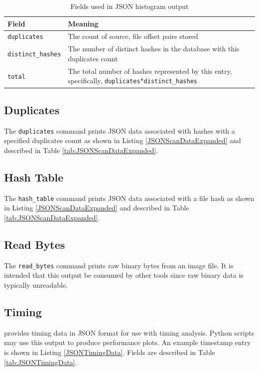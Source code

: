 \documentclass[11pt,fleqn]{article} %
\begin{document}
\begin{table}[!ht]

\centering
\caption{Fields used in JSON histogram output}
\label{tab:JSONHistogram}
\begin{tabular}{|p{5 cm}|p{8.8 cm}|}
\hline \hline
\textbf{Field} & \textbf{Meaning} \\
\hline
\verb+duplicates+ & The count of source, file offset pairs stored\\
\hline
\verb+distinct_hashes+ & The number of distinct hashes in the database with this duplicates count\\
\hline
\verb+total+ & The total number of hashes represented by this entry, specifically, \verb+duplicates+$*$\verb+distinct_hashes+\\
\hline
\end{tabular}
\end{table}

\subsection{Duplicates}
The \verb+duplicates+ command prints JSON data associated with hashes with a specified duplicates count as shown in Listing \ref{JSONScanDataExpanded} and described in Table \ref{tab:JSONScanDataExpanded}.\\

\subsection{Hash Table}
The \verb+hash_table+ command prints JSON data associated with a file hash as shown in Listing \ref{JSONScanDataExpanded} and described in Table \ref{tab:JSONScanDataExpanded}.\\

\subsection{Read Bytes}
The \verb+read_bytes+ command prints raw binary bytes from an image file. It is intended that this output be consumed by other tools since raw binary data is typically unreadable.\\

\subsection{Timing}
\hdb provides timing data in JSON format for use with timing analysis. Python scripts may use this output to produce performance plots. An example timestamp entry is shown in Listing \ref{JSONTimingData}. Fields are described in Table \ref{tab:JSONTimingData}.\\
\end{document}
